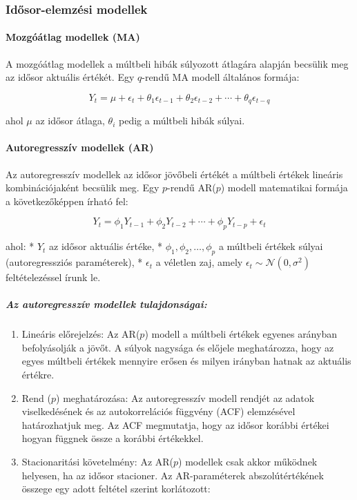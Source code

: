 \documentclass[11pt]{article}
\providecommand{\tightlist}{%
      \setlength{\itemsep}{0pt}\setlength{\parskip}{0pt}}
\begin{document}
    \subsubsection{Idősor-elemzési
modellek}\label{idux151sor-elemzuxe9si-modellek}

\paragraph{Mozgóátlag modellek (MA)}\label{mozguxf3uxe1tlag-modellek-ma}

A mozgóátlag modellek a múltbeli hibák súlyozott átlagára alapján
becsülik meg az idősor aktuális értékét. Egy \(q\)-rendű MA modell
általános formája:

\[Y_t = \mu + \epsilon_t + \theta_1 \epsilon_{t-1} + \theta_2 \epsilon_{t-2} + \cdots + \theta_q \epsilon_{t-q}\]

ahol \(\mu\) az idősor átlaga, \(\theta_i\) pedig a múltbeli hibák
súlyai.

\paragraph{Autoregresszív modellek
(AR)}\label{autoregresszuxedv-modellek-ar}

Az autoregresszív modellek az idősor jövőbeli értékét a múltbeli értékek
lineáris kombinációjaként becsülik meg. Egy \(p\)-rendű AR(\(p\)) modell
matematikai formája a következőképpen írható fel:

\[Y_t = \phi_1 Y_{t-1} + \phi_2 Y_{t-2} + \cdots + \phi_p Y_{t-p} + \epsilon_t\]

ahol: * \(Y_t\) az idősor aktuális értéke, *
\(\phi_1, \phi_2, \ldots, \phi_p\) a múltbeli értékek súlyai
(autoregressziós paraméterek), * \(\epsilon_t\) a véletlen zaj, amely
\(\epsilon_t \sim \mathcal{N}(0, \sigma^2)\) feltételezéssel írunk le.

\subparagraph{Az autoregresszív modellek
tulajdonságai:}\label{az-autoregresszuxedv-modellek-tulajdonsuxe1gai}

\begin{enumerate}
\def\labelenumi{\arabic{enumi}.}
\tightlist
\item
  Lineáris előrejelzés: Az AR(\(p\)) modell a múltbeli értékek egyenes
  arányban befolyásolják a jövőt. A súlyok nagysága és előjele
  meghatározza, hogy az egyes múltbeli értékek mennyire erősen és milyen
  irányban hatnak az aktuális értékre.
\item
  Rend (\(p\)) meghatározása: Az autoregresszív modell rendjét az adatok
  viselkedésének és az autokorrelációs függvény (ACF) elemzésével
  határozhatjuk meg. Az ACF megmutatja, hogy az idősor korábbi értékei
  hogyan függnek össze a korábbi értékekkel.
\item
  Stacionaritási követelmény: Az AR(\(p\)) modellek csak akkor működnek
  helyesen, ha az idősor stacioner. Az AR-paraméterek abszolútértékének
  összege egy adott feltétel szerint korlátozott:
\end{enumerate}
\end{document}
